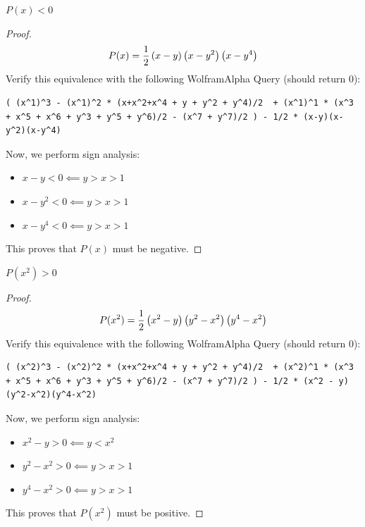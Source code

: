\documentclass[10pt]{../usamts}
\begin{document}
\begin{solution}
\begin{claim}
    $P(x) < 0$
    \label{claim:px}
\end{claim}
\begin{proof}
    $$P(x) = \frac{1}{2}\left( x-y \right)\left( x-y^2 \right)\left( x-y^4 \right)$$
    Verify this equivalence with the following WolframAlpha Query (should return $0$): 
\begin{lstlisting}
( (x^1)^3 - (x^1)^2 * (x+x^2+x^4 + y + y^2 + y^4)/2  + (x^1)^1 * (x^3 + x^5 + x^6 + y^3 + y^5 + y^6)/2 - (x^7 + y^7)/2 ) - 1/2 * (x-y)(x-y^2)(x-y^4)
\end{lstlisting}
    Now, we perform sign analysis:
    \begin{itemize}
        \item $x - y < 0 \impliedby y > x > 1$
        \item $x - y^2 < 0 \impliedby y > x > 1$
        \item $x - y^4 < 0 \impliedby y > x > 1$
    \end{itemize}
    This proves that $P(x)$ must be negative.
\end{proof}

\begin{claim}
    $P(x^2) > 0$
    \label{claim:px2}
\end{claim}
\begin{proof}
    $$P(x^2) = \frac{1}{2} \left( x^2-y \right)\left( y^2 - x^2 \right)\left( y^4 - x^2 \right)$$
    Verify this equivalence with the following WolframAlpha Query (should return $0$): 
\begin{lstlisting}
( (x^2)^3 - (x^2)^2 * (x+x^2+x^4 + y + y^2 + y^4)/2  + (x^2)^1 * (x^3 + x^5 + x^6 + y^3 + y^5 + y^6)/2 - (x^7 + y^7)/2 ) - 1/2 * (x^2 - y)(y^2-x^2)(y^4-x^2)
\end{lstlisting}
    Now, we perform sign analysis:
    \begin{itemize}
        \item $x^2 - y > 0 \impliedby y < x^2$
        \item $y^2 - x^2 > 0 \impliedby y > x > 1$
        \item $y^4 - x^2 > 0 \impliedby y > x > 1$
    \end{itemize}
    This proves that $P(x^2)$ must be positive.
\end{proof}


\end{solution}
\end{document}
